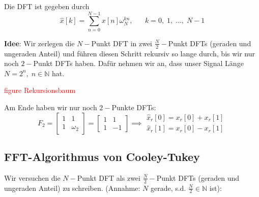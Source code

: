 \documentclass[11pt]{article}
\begin{document}

Die DFT ist gegeben durch 
$$\hat{x}[k] = \sum_{n=0}^{N-1} x[n]\omega_N^{kn}, \hspace{20pt} k=0, \; 1, \; \dots, \; N-1$$

\textbf{Idee}: Wir zerlegen die $N-$Punkt DFT in zwei $\frac{N}{2}-$Punkt DFTs (geraden und ungeraden Anteil) und führen diesen Schritt rekursiv so lange durch, bis wir nur noch $2-$Punkt DFTs haben. Dafür nehmen wir an, dass unser Signal Länge $N=2^n, \; n \in \mathbb{N}$ hat.

\textcolor{red}{figure Rekursionsbaum}

Am Ende haben wir nur noch $2-$Punkte DFTs:
$$F_2 = \begin{bmatrix}
    1 & 1 \\
    1 & \omega_2
\end{bmatrix} = \begin{bmatrix}
    1 & 1 \\
    1 & -1
\end{bmatrix} \implies \begin{array}{l}
    \hat{x}_r[0] = x_r[0] + x_r[1] \\
    \hat{x}_r[1] = x_r[0] - x_r[1]
\end{array}$$

\subsection*{FFT-Algorithmus von Cooley-Tukey}
\vspace*{-0.5cm}
Wir versuchen die $N-$Punkt DFT als zwei $\frac{N}{2}-$Punkt DFTs (geraden und ungeraden Anteil) zu schreiben. (Annahme: $N$ gerade, s.d. $\frac{N}{2} \in \mathbb{N}$ ist):
\end{document}
